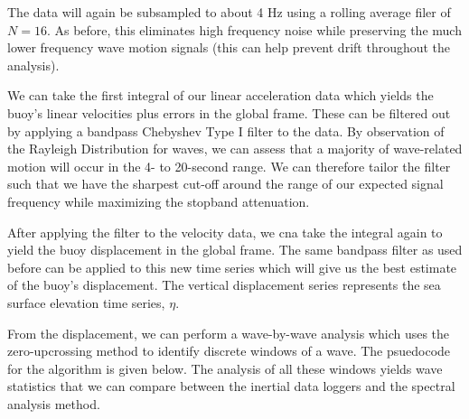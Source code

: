 The data will again be subsampled to about 4 Hz using a rolling average filer of $N=16$. 
As before, this eliminates high frequency noise while preserving the much lower frequency wave motion signals (this can help prevent drift throughout the analysis).

We can take the first integral of our linear acceleration data which yields the buoy’s linear velocities plus errors in the global frame. 
These can be filtered out by applying a bandpass Chebyshev Type I filter to the data. 
By observation of the Rayleigh Distribution for waves, we can assess that a majority of wave-related motion will occur in the 4- to 20-second range. 
We can therefore tailor the filter such that we have the sharpest cut-off around the range of our expected signal frequency while maximizing the stopband attenuation.

After applying the filter to the velocity data, we cna take the integral again to yield the buoy displacement in the global frame. 
The same bandpass filter as used before can be applied to this new time series which will give us the best estimate of the buoy’s displacement. 
The vertical displacement series represents the sea surface elevation time series, $\eta$.

From the displacement, we can perform a wave-by-wave analysis which uses the zero-upcrossing method to identify discrete windows of a wave. 
The psuedocode for the algorithm is given below. 
The analysis of all these windows yields wave statistics that we can compare between the inertial data loggers and the spectral analysis method.





